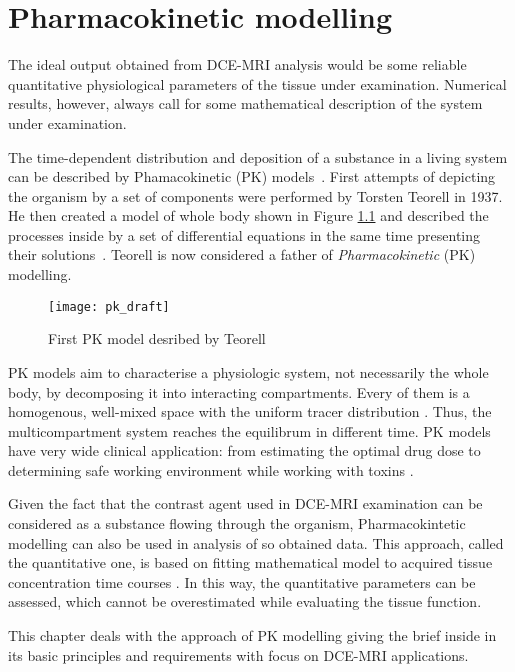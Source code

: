 \chapter{Pharmacokinetic modelling}
\label{chapter:pk}

The ideal output obtained from DCE-MRI analysis would be some reliable quantitative physiological parameters of the tissue under examination. Numerical results, however, always call for some mathematical description of the system under examination. 

The time-dependent distribution and deposition of a substance in a living system can be described by Phamacokinetic (PK) models~\cite{gerlowski1983physiologically}. First attempts of depicting the organism by a set of components were performed by Torsten Teorell in 1937. He then created a model of whole body shown in Figure \ref{fig:pk_draft} and described the processes inside by a set of differential equations in the same time presenting  their solutions~\cite{pkfather}. Teorell is now considered  a father of \textit{Pharmacokinetic} (PK) modelling. 

\begin{figure}[t]
		\centering
		\texttt{[image: pk\_draft]}
		\caption [Teorell's first PK model]{First PK model desribed by Teorell \cite{pkfather}}
		\label{fig:pk_draft}
	\end{figure}

PK models aim to characterise a physiologic system, not necessarily the whole body, by decomposing it into interacting compartments. Every of them is a homogenous, well-mixed space with the uniform tracer distribution \cite{PMID:20540902}.
Thus, the multicompartment system reaches the equilibrum in different time.  PK models have very wide clinical application: from estimating the optimal drug dose to determining safe working environment while working with toxins  \cite{gerlowski1983physiologically}.

Given the fact that the contrast agent used in DCE-MRI examination can be considered as a substance flowing through the organism, Pharmacokintetic modelling can also be used in analysis of so obtained data.   
This approach, called the quantitative one, is based on fitting mathematical model to acquired tissue concentration time courses \cite{khalifa2014models, jackson2005dynamic, barnes2012practical}. In this way, the quantitative parameters can be assessed, which cannot be overestimated while evaluating the tissue function. 


This chapter deals with the approach of PK modelling giving the brief inside in its basic principles and requirements with focus on DCE-MRI applications. 
\newpage



